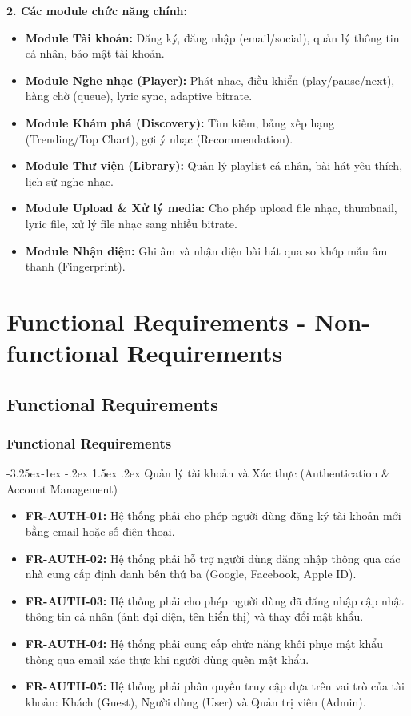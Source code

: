 \documentclass[a4paper]{article}
\makeatletter
\newcounter {subsubsubsection}[subsubsection]
\newcommand\subsubsubsection{\@startsection{subsubsubsection}{4}{\z@}%
                                     {-3.25ex\@plus -1ex \@minus -.2ex}%
                                     {1.5ex \@plus .2ex}%
                                     {\normalfont\normalsize\bfseries}}
\makeatother
\begin{document}
\vspace{0.5em}
\textbf{2. Các module chức năng chính:}
\begin{itemize}
    \item \textbf{Module Tài khoản:} Đăng ký, đăng nhập (email/social), quản lý thông tin cá nhân, bảo mật tài khoản.
    \item \textbf{Module Nghe nhạc (Player):} Phát nhạc, điều khiển (play/pause/next), hàng chờ (queue), lyric sync, adaptive bitrate.
    \item \textbf{Module Khám phá (Discovery):} Tìm kiếm, bảng xếp hạng (Trending/Top Chart), gợi ý nhạc (Recommendation).
    \item \textbf{Module Thư viện (Library):} Quản lý playlist cá nhân, bài hát yêu thích, lịch sử nghe nhạc.
    \item \textbf{Module Upload \& Xử lý media:} Cho phép upload file nhạc, thumbnail, lyric file, xử lý file nhạc sang nhiều bitrate.
    \item \textbf{Module Nhận diện:} Ghi âm và nhận diện bài hát qua so khớp mẫu âm thanh (Fingerprint).
\end{itemize}
\section{Functional Requirements - Non-functional Requirements}
\subsection{Functional Requirements}
\subsubsection{Functional Requirements}

\subsubsubsection{Quản lý tài khoản và Xác thực (Authentication \& Account Management)}
\begin{itemize}
    \item \textbf{FR-AUTH-01:} Hệ thống phải cho phép người dùng đăng ký tài khoản mới bằng email hoặc số điện thoại.
    \item \textbf{FR-AUTH-02:} Hệ thống phải hỗ trợ người dùng đăng nhập thông qua các nhà cung cấp định danh bên thứ ba (Google, Facebook, Apple ID).
    \item \textbf{FR-AUTH-03:} Hệ thống phải cho phép người dùng đã đăng nhập cập nhật thông tin cá nhân (ảnh đại diện, tên hiển thị) và thay đổi mật khẩu.
    \item \textbf{FR-AUTH-04:} Hệ thống phải cung cấp chức năng khôi phục mật khẩu thông qua email xác thực khi người dùng quên mật khẩu.
    \item \textbf{FR-AUTH-05:} Hệ thống phải phân quyền truy cập dựa trên vai trò của tài khoản: Khách (Guest), Người dùng (User) và Quản trị viên (Admin).
\end{itemize}
\end{document}
